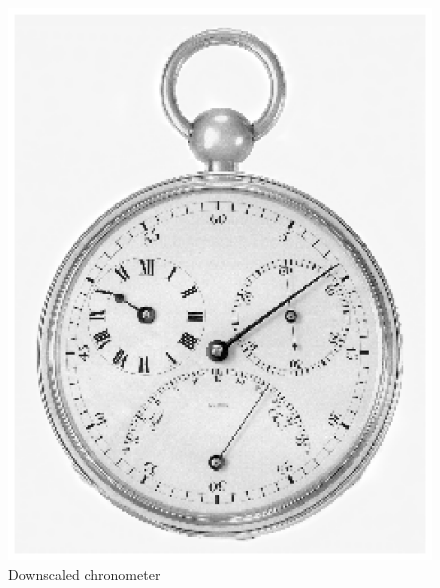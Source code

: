 \begin{figure}
 \centering
 \includegraphics{scaledDownChrono.eps}
 \caption{Downscaled chronometer}
 \label{fig:chrono_down}
\end{figure}